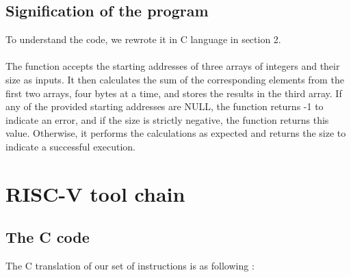 \documentclass[a4paper,12pt]{article}
\begin{document}
\subsection{Signification of the program}
To understand the code, we rewrote it in C language in section 2.\\
\\
%
The function accepts the starting addresses of three arrays of integers and their size as inputs. It then calculates the sum of the corresponding elements from the first two arrays, four bytes at a time, and stores the results in the third array. If any of the provided starting addresses are NULL, the function returns -1 to indicate an error, and if the size is strictly negative, the function returns this value. Otherwise, it performs the calculations as expected and returns the size to indicate a successful execution.
\section{RISC-V tool chain}
\subsection{The C code}
The C translation of our set of instructions is as following :

\inputminted{c}{se201-prog.c}
\end{document}
